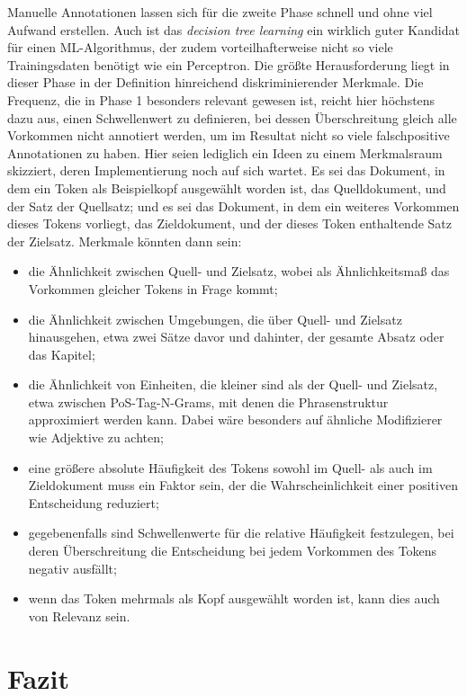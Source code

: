 \documentclass{article}
\newcommand*{\englisch}[1]{\foreignlanguage{english}{\textit{#1}}}%
\begin{document}
Manuelle Annotationen lassen sich für die zweite Phase schnell und
ohne viel Aufwand erstellen. Auch ist das \englisch{decision tree
  learning} ein wirklich guter Kandidat für einen ML-Algorithmus, der
zudem vorteilhafterweise nicht so viele Trainingsdaten benötigt wie
ein Perceptron. Die größte Herausforderung liegt in dieser Phase in
der Definition hinreichend diskriminierender Merkmale. Die Frequenz,
die in Phase 1 besonders relevant gewesen ist, reicht hier höchstens
dazu aus, einen Schwellenwert zu definieren, bei dessen Überschreitung
gleich alle Vorkommen nicht annotiert werden, um im Resultat nicht so
viele falschpositive Annotationen zu haben. Hier seien lediglich ein
Ideen zu einem Merkmalsraum skizziert, deren Implementierung noch auf
sich wartet. Es sei das Dokument, in dem ein Token als Beispielkopf
ausgewählt worden ist, das Quelldokument, und der Satz der Quellsatz;
und es sei das Dokument, in dem ein weiteres Vorkommen dieses Tokens
vorliegt, das Zieldokument, und der dieses Token enthaltende Satz der
Zielsatz. Merkmale könnten dann sein:
\begin{itemize}
\item die Ähnlichkeit zwischen Quell- und Zielsatz, wobei als
  Ähnlichkeitsmaß das Vorkommen gleicher Tokens in Frage kommt;
\item die Ähnlichkeit zwischen Umgebungen, die über Quell- und
  Zielsatz hinausgehen, etwa zwei Sätze davor und dahinter, der
  gesamte Absatz oder das Kapitel;
\item die Ähnlichkeit von Einheiten, die kleiner sind als der Quell-
  und Zielsatz, etwa zwischen PoS-Tag-N-Grams, mit denen die
  Phrasenstruktur approximiert werden kann. Dabei wäre besonders auf
  ähnliche Modifizierer wie Adjektive zu achten;
\item eine größere absolute Häufigkeit des Tokens sowohl im Quell- als
  auch im Zieldokument muss ein Faktor sein, der die
  Wahrscheinlichkeit einer positiven Entscheidung reduziert;
\item gegebenenfalls sind Schwellenwerte für die relative Häufigkeit
  festzulegen, bei deren Überschreitung die Entscheidung bei jedem
  Vorkommen des Tokens negativ ausfällt;
\item wenn das Token mehrmals als Kopf ausgewählt worden ist, kann
  dies auch von Relevanz sein.
\end{itemize}

\section*{Fazit}
\end{document}
